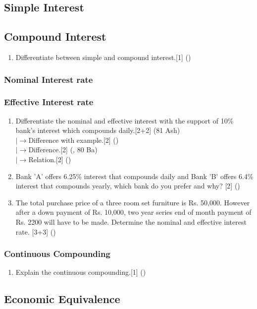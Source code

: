 \documentclass[12pt]{article}
\newcommand{\lb}{\\ $\left|\rightarrow\right.$}
\begin{document}
	\subsection{Simple Interest}
	\subsection{Compound Interest}
	\begin{enumerate}
	\item Differentiate between simple and compound interest.\hfill[1] ()
	\end{enumerate}
	\subsubsection{Nominal Interest rate}
	\subsubsection{Effective Interest rate}
	\begin{enumerate}
	\item Differentiate the nominal and effective interest with the support of 10\% bank's interest which compounds daily.\hfill[2+2] (81 Ash)
	\lb Difference with example.\hfill[2] ()
	\lb Difference.\hfill[2] (, 80 Ba)
	\lb Relation.\hfill[2] ()

	\item Bank 'A' offers 6.25\% interest that compounds daily and Bank 'B' offers 6.4\% interest that compounds yearly, which bank do you prefer and why?\hspace{6.2cm} [2] ()

	\item The total purchase price of a three room set furniture is Rs. 50,000. However after a down payment of Rs. 10,000, two year series end of month payment of Rs. 2200 will have to be made.  Determine the nominal and effective interest rate. \hfill [3+3] ()
	\end{enumerate}
	\subsubsection{Continuous Compounding}
	\begin{enumerate}
	\item Explain the continuous compounding.\hfill[1] ()
	\end{enumerate}
	\subsection{Economic Equivalence}
\end{document}
